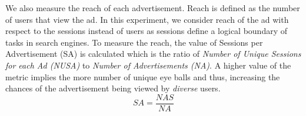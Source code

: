 We also measure the reach of each advertisement. Reach is defined as the number of users that view the ad. In this experiment, we consider reach of the ad with respect to the sessions instead of users as sessions define a logical boundary of tasks in search engines. To measure the reach,  the value of Sessions per Advertisement (SA) is calculated which is  the ratio of  {\it Number of Unique Sessions for each Ad (NUSA)} to {\it Number of Advertisements (NA)}. A higher value of the metric implies the more number of unique eye balls and thus, increasing the chances of the advertisement being viewed by {\it diverse} users.
\begin{equation}
    SA = \frac{NAS}{NA}
\end{equation}

\begin{figure}[h]
  \centering
  \qquad
	\qquad

\end{figure}
